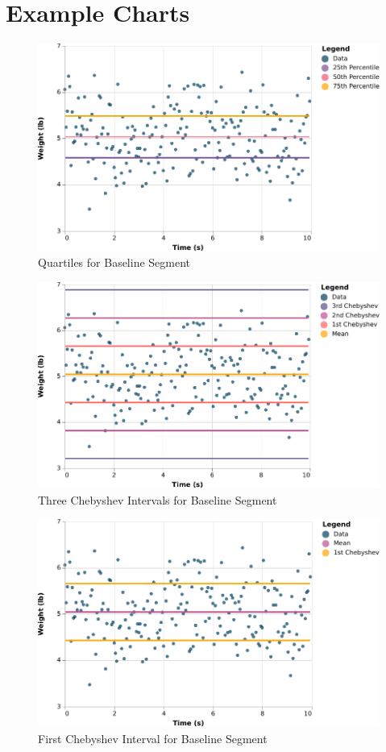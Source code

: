 \section{Example Charts}
%
\begin{figure}[ht]
    \centering
    \includegraphics{chart/00-intro/baseline-quartiles.pdf}
    \caption{Quartiles for Baseline Segment}
    \label{figure:00.baseline.quartiles}
\end{figure}
%
\begin{figure}[ht]
    \centering
    \includegraphics{chart/00-intro/baseline-chebyshev.pdf}
    \caption{Three Chebyshev Intervals for Baseline Segment}
    \label{figure:00.baseline.chebyshev}
\end{figure}
%
\begin{figure}[ht]
    \centering
    \includegraphics{chart/00-intro/baseline-chebyshev-1.pdf}
    \caption{First Chebyshev Interval for Baseline Segment}
    \label{figure:00.baseline.chebyshev.1}
\end{figure}
